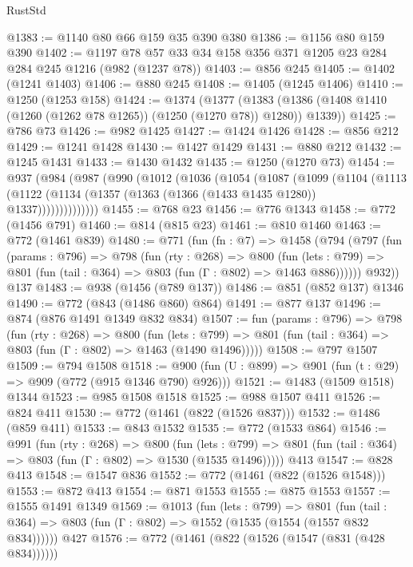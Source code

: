 \begin{lexlean}{RustStd}
\begin{coremodule}
@1383 := @1140 @80 @66 @159 @35 @390 @380
@1386 := @1156 @80 @159 @390
@1402 := @1197 @78 @57 @33 @34 @158 @356 @371 @1205 @23 @284 @284 @245 @1216 (@982 (@1237 @78))
@1403 := @856 @245
@1405 := @1402 (@1241 @1403)
@1406 := @880 @245
@1408 := @1405 (@1245 @1406)
@1410 := @1250 (@1253 @158)
@1424 := @1374
    (@1377 (@1383 (@1386 (@1408 @1410 (@1260 (@1262 @78 @1265)) (@1250 (@1270 @78)) @1280)) @1339))
@1425 := @786 @73
@1426 := @982 @1425
@1427 := @1424 @1426
@1428 := @856 @212
@1429 := @1241 @1428
@1430 := @1427 @1429
@1431 := @880 @212
@1432 := @1245 @1431
@1433 := @1430 @1432
@1435 := @1250 (@1270 @73)
@1454 := @937
    (@984
      (@987
        (@990
          (@1012
            (@1036
              (@1054
                (@1087
                  (@1099
                    (@1104
                      (@1113
                        (@1122 (@1134 (@1357 (@1363 (@1366 (@1433 @1435 @1280)) @1337))))))))))))))
@1455 := @768 @23
@1456 := @776 @1343
@1458 := @772 (@1456 @791)
@1460 := @814 (@815 @23)
@1461 := @810 @1460
@1463 := @772 (@1461 @839)
@1480 := @771
    (fun (fn : @7) =>
    @1458
      (@794
        (@797
          (fun (params : @796) =>
          @798
            (fun (rty : @268) =>
            @800
              (fun (lets : @799) =>
              @801 (fun (tail : @364) => @803 (fun (Γ : @802) => @1463 @886))))))
        @932))
    @137
@1483 := @938 (@1456 (@789 @137))
@1486 := @851 (@852 @137) @1346
@1490 := @772 (@843 (@1486 @860) @864)
@1491 := @877 @137
@1496 := @874 (@876 @1491 @1349 @832 @834)
@1507 := fun (params : @796) =>
  @798
    (fun (rty : @268) =>
    @800
      (fun (lets : @799) =>
      @801 (fun (tail : @364) => @803 (fun (Γ : @802) => @1463 (@1490 @1496)))))
@1508 := @797 @1507
@1509 := @794 @1508
@1518 := @900 (fun (U : @899) => @901 (fun (t : @29) => @909 (@772 (@915 @1346 @790) @926)))
@1521 := @1483 (@1509 @1518) @1344
@1523 := @985 @1508 @1518
@1525 := @988 @1507 @411
@1526 := @824 @411
@1530 := @772 (@1461 (@822 (@1526 @837)))
@1532 := @1486 (@859 @411)
@1533 := @843 @1532
@1535 := @772 (@1533 @864)
@1546 := @991
    (fun (rty : @268) =>
    @800
      (fun (lets : @799) =>
      @801 (fun (tail : @364) => @803 (fun (Γ : @802) => @1530 (@1535 @1496)))))
    @413
@1547 := @828 @413
@1548 := @1547 @836
@1552 := @772 (@1461 (@822 (@1526 @1548)))
@1553 := @872 @413
@1554 := @871 @1553
@1555 := @875 @1553
@1557 := @1555 @1491 @1349
@1569 := @1013
    (fun (lets : @799) =>
    @801 (fun (tail : @364) => @803 (fun (Γ : @802) => @1552 (@1535 (@1554 (@1557 @832 @834))))))
    @427
@1576 := @772 (@1461 (@822 (@1526 (@1547 (@831 (@428 @834))))))

\end{coremodule}
\end{lexlean}
